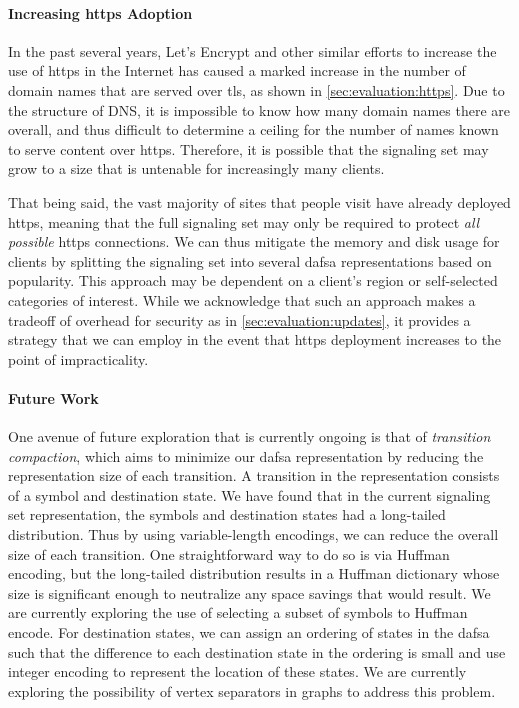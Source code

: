 \paragraph{Increasing \ac{https} Adoption}

In the past several years, Let's Encrypt and other similar efforts to increase
the use of \ac{https} in the Internet has caused a marked increase in the number
of domain names that are served over \ac{tls}, as shown in
\autoref{sec:evaluation:https}. Due to the structure of DNS, it is impossible to
know how many domain names there are overall, and thus difficult to determine a
ceiling for the number of names known to serve content over \ac{https}.
Therefore, it is possible that the signaling set may grow to a size that is
untenable for increasingly many clients.

That being said, the vast majority of sites that people visit have already
deployed \ac{https}, meaning that the full signaling set may only be required to
protect \emph{all possible} \ac{https} connections. We can thus mitigate the
memory and disk usage for clients by splitting the signaling set into several
\ac{dafsa} representations based on popularity. This approach may be dependent
on a client's region or self-selected categories of interest. While we
acknowledge that such an approach makes a tradeoff of overhead for security as
in \autoref{sec:evaluation:updates}, it provides a strategy that we can employ
in the event that \ac{https} deployment increases to the point of
impracticality.

\paragraph{Future Work}

One avenue of future exploration that is currently ongoing is that of
\emph{transition compaction}, which aims to minimize our \ac{dafsa}
representation by reducing the representation size of each transition. A
transition in the representation consists of a symbol and destination state. We
have found that in the current signaling set representation, the symbols and
destination states had a long-tailed distribution. Thus by using variable-length
encodings, we can reduce the overall size of each transition. One
straightforward way to do so is via Huffman encoding, but the long-tailed
distribution results in a Huffman dictionary whose size is significant enough to
neutralize any space savings that would result. We are currently exploring the
use of selecting a subset of symbols to Huffman encode. For destination states,
we can assign an ordering of states in the \ac{dafsa} such that the difference
to each destination state in the ordering is small and use integer encoding to
represent the location of these states. We are currently exploring the
possibility of vertex separators in graphs to address this problem.

